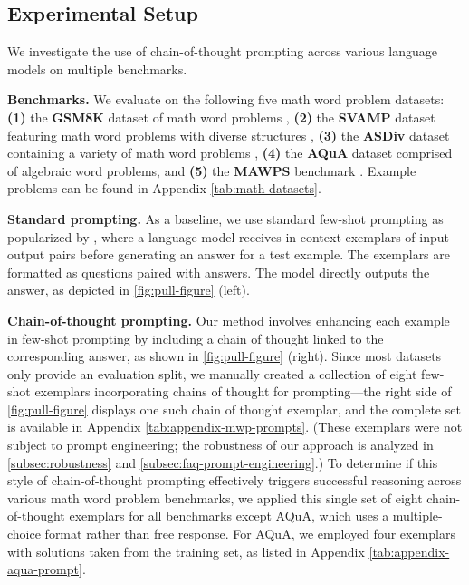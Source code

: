 \subsection{Experimental Setup}

We investigate the use of chain-of-thought prompting across various language models on multiple benchmarks.

\textbf{Benchmarks.}
We evaluate on the following five math word problem datasets:
\textbf{(1)} the \textbf{GSM8K} dataset of math word problems \citep{cobbe2021training}, 
\textbf{(2)} the \textbf{SVAMP} dataset featuring math word problems with diverse structures \citep{patel-etal-2021-nlp},
\textbf{(3)} the \textbf{ASDiv} dataset containing a variety of math word problems \citep{miao-etal-2020-diverse},
\textbf{(4)} the \textbf{AQuA} dataset comprised of algebraic word problems, and
\textbf{(5)} the \textbf{MAWPS} benchmark \citep{koncel-kedziorski-etal-2016-mawps}. Example problems can be found in Appendix \cref{tab:math-datasets}.

\textbf{Standard prompting.} As a baseline, we use standard few-shot prompting as popularized by \citet{brown2020language}, where a language model receives in-context exemplars of input-output pairs before generating an answer for a test example. The exemplars are formatted as questions paired with answers. The model directly outputs the answer, as depicted in \cref{fig:pull-figure} (left).

\textbf{Chain-of-thought prompting.} Our method involves enhancing each example in few-shot prompting by including a chain of thought linked to the corresponding answer, as shown in \cref{fig:pull-figure} (right). Since most datasets only provide an evaluation split, we manually created a collection of eight few-shot exemplars incorporating chains of thought for prompting—the right side of \cref{fig:pull-figure} displays one such chain of thought exemplar, and the complete set is available in Appendix \cref{tab:appendix-mwp-prompts}. (These exemplars were not subject to prompt engineering; the robustness of our approach is analyzed in \cref{subsec:robustness} and \cref{subsec:faq-prompt-engineering}.) To determine if this style of chain-of-thought prompting effectively triggers successful reasoning across various math word problem benchmarks, we applied this single set of eight chain-of-thought exemplars for all benchmarks except AQuA, which uses a multiple-choice format rather than free response. For AQuA, we employed four exemplars with solutions taken from the training set, as listed in Appendix \cref{tab:appendix-aqua-prompt}.

